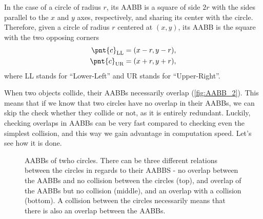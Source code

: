 In the case of a circle of radius $r$, its AABB is a square of side $2r$ with the sides parallel to the $x$ and $y$ axes, respectively, and sharing its center with the circle. Therefore, given a circle of radius $r$ centered at $(x,y)$, its AABB is the square with the two opposing corners
\begin{equation}
	\begin{aligned}
		\pnt{c}_{\text{LL}} & =(x-r,y-r), \\
		\pnt{c}_{\text{UR}} & =(x+r,y+r),
	\end{aligned}
	\label{eq:circle_AABB}
\end{equation}
where LL stands for \enquote{Lower-Left} and UR stands for \enquote{Upper-Right}.

When two objects collide, their AABBs necessarily overlap (\autoref{fig:AABB_2}). This means that if we know that two circles have no overlap in their AABBs, we can skip the check whether they collide or not, as it is entirely redundant. Luckily, checking overlaps in AABBs can be very fast compared to checking even the simplest collision, and this way we gain advantage in computation speed. Let's see how it is done.

\begin{figure}
	\begin{center}
	\end{center}
	\caption{AABBs of twho circles. There can be three different relations between the circles in regards to their AABBS - no overlap between the AABBs and no collision between the circles (top), and overlap of the AABBs but no collision (middle), and an overlap with a collision (bottom). A collision between the circles necessarily means that there is also an overlap between the AABBs.}
	\label{fig:AABB_2}
\end{figure}

